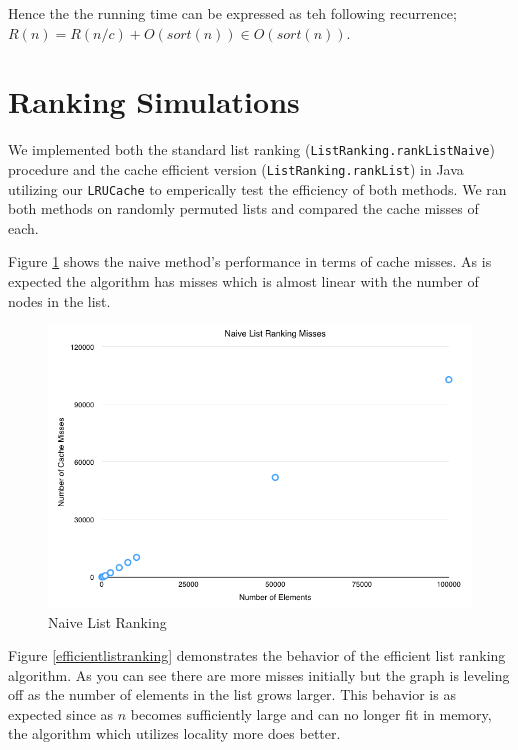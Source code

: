\documentclass[11pt]{article}
\begin{document}
Hence the the running time can be expressed as teh following recurrence; $R(n) = R(n/c) + O(sort(n)) \in O(sort(n))$.

\section{Ranking Simulations}

We implemented both the standard list ranking (\texttt{ListRanking.rankListNaive}) procedure and the cache efficient version
 (\texttt{ListRanking.rankList}) in Java utilizing our \texttt{LRUCache} to emperically test the 
efficiency of  both methods.  We ran both methods on randomly permuted lists and compared the cache misses of each.  

Figure \ref{naivelistranking} shows the naive method's performance in terms of cache misses.  As is expected the algorithm has misses which is almost linear with the number of nodes in the list.

\begin{figure}[H]  
\includegraphics[scale=0.5]{figures/NaiveListRanking.png}
\caption{Naive List Ranking}
\label{naivelistranking}
\end{figure}

Figure \ref{efficientlistranking}  demonstrates the behavior of the efficient list ranking algorithm. As you can see there are more misses initially but the graph is leveling off as the number of elements in the list grows larger.  This behavior is 
as expected since as $n$ becomes sufficiently large and can no longer fit in memory, the algorithm which utilizes locality more does better.
\end{document}

